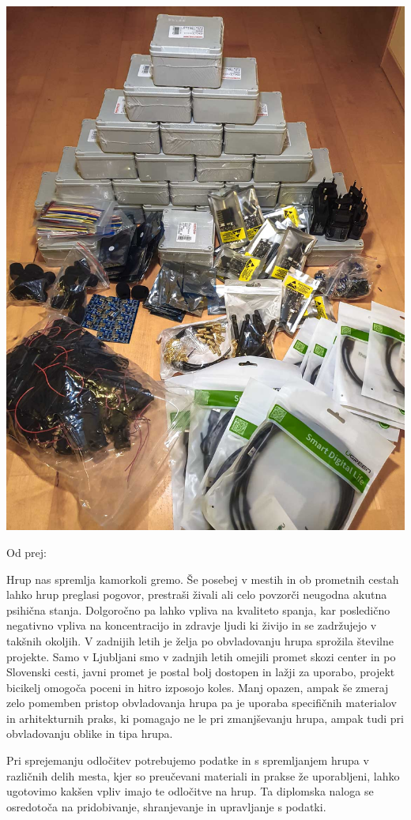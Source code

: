 \documentclass[a4paper, 12pt]{book}
\begin{document}
\includegraphics{slikovno_gradivo/inventorij.jpg}


Od prej:


Hrup nas spremlja kamorkoli gremo. Še posebej v mestih in ob prometnih cestah lahko hrup preglasi pogovor, prestraši živali ali celo povzorči neugodna akutna psihična stanja. Dolgoročno pa lahko vpliva na kvaliteto spanja, kar posledično negativno vpliva na koncentracijo in zdravje ljudi ki živijo in se zadržujejo v takšnih okoljih. V zadnijih letih je želja po obvladovanju hrupa sprožila številne projekte. Samo v Ljubljani smo v zadnjih letih omejili promet skozi center in po Slovenski cesti, javni promet je postal bolj dostopen in lažji za uporabo, projekt bicikelj omogoča poceni in hitro izposojo koles. Manj opazen, ampak še zmeraj zelo pomemben pristop obvladovanja hrupa pa je uporaba specifičnih materialov in arhitekturnih praks, ki pomagajo ne le pri zmanjševanju hrupa, ampak tudi pri obvladovanju oblike in tipa hrupa. 

Pri sprejemanju odločitev potrebujemo podatke in s spremljanjem hrupa v različnih delih mesta, kjer so preučevani materiali in prakse že uporabljeni, lahko ugotovimo kakšen vpliv imajo te odločitve na hrup. Ta diplomska naloga se osredotoča na pridobivanje, shranjevanje in upravljanje s podatki. 
\end{document}
